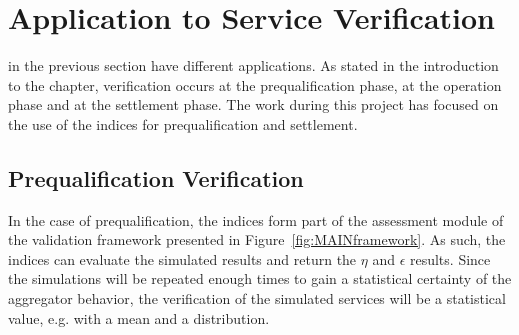 
\section{Application to Service Verification}
 in the previous section have different applications. As stated in the introduction to the chapter, verification occurs at the prequalification phase, at the operation phase and at the settlement phase. The work during this project has focused on the use of the indices for prequalification and settlement. 

\subsection{Prequalification Verification}
In the case of prequalification, the indices form part of the assessment module of the validation framework presented in Figure~\ref{fig:MAINframework}. As such, the indices can evaluate the simulated results and return the $\eta$ and $\epsilon$ results. Since the simulations will be repeated enough times to gain a statistical certainty of the aggregator behavior, the verification of the simulated services will be a statistical value, e.g. with a mean and a distribution.


